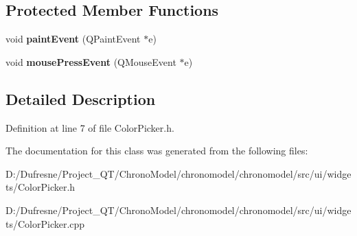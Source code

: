 \subsection*{Protected Member Functions}
\begin{DoxyCompactItemize}
\item 
\hypertarget{class_color_picker_afa0bbf41340688c5e55c6075b06eb4f5}{void {\bfseries paint\-Event} (Q\-Paint\-Event $\ast$e)}\label{class_color_picker_afa0bbf41340688c5e55c6075b06eb4f5}

\item 
\hypertarget{class_color_picker_afc3b25ae92c6aae45f9faa5bdfd21773}{void {\bfseries mouse\-Press\-Event} (Q\-Mouse\-Event $\ast$e)}\label{class_color_picker_afc3b25ae92c6aae45f9faa5bdfd21773}

\end{DoxyCompactItemize}


\subsection{Detailed Description}


Definition at line 7 of file Color\-Picker.\-h.



The documentation for this class was generated from the following files\-:\begin{DoxyCompactItemize}
\item 
D\-:/\-Dufresne/\-Project\-\_\-\-Q\-T/\-Chrono\-Model/chronomodel/chronomodel/src/ui/widgets/Color\-Picker.\-h\item 
D\-:/\-Dufresne/\-Project\-\_\-\-Q\-T/\-Chrono\-Model/chronomodel/chronomodel/src/ui/widgets/Color\-Picker.\-cpp\end{DoxyCompactItemize}
